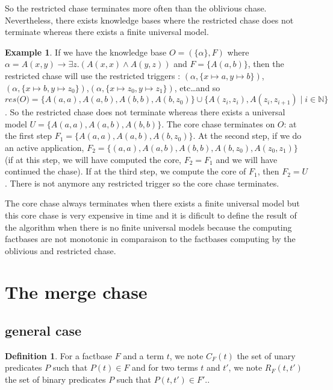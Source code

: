 \documentclass{article}
\theoremstyle{definition}
\newtheorem{definition}{Definition}[section]
\newtheorem{example}{Example}[section]
\theoremstyle{remark}
\def \N {\mathbb N}
\begin{document}
So the restricted chase terminates more often than the oblivious chase. Nevertheless, there exists knowledge bases where the restricted chase does not terminate whereas there exists a finite universal model. \begin{example}
If we have the knowledge base $O=(\{\alpha\},F)$ where $\alpha = A(x,y) \rightarrow \exists z.(A(x,x) \wedge A(y,z))$ and $F =  \{A(a,b)\}$, then the restricted chase will use the restricted triggers : $(\alpha, \{x \mapsto a, y \mapsto b\})$, $(\alpha, \{x \mapsto b, y \mapsto z_0\})$,$(\alpha, \{x \mapsto z_0, y \mapsto z_1\})$, etc\ldots and so  $\textit{res(O)} = \{A(a,a),A(a,b),A(b,b),A(b,z_0)\} \cup \{A(z_i,z_i),A(z_i,z_{i+1})\mid i \in \N\}$. So the restricted chase does not terminate whereas there exists a universal model $U = \{A(a,a),A(a,b),A(b,b)\}$. The core chase terminates on $O$: at the first step $F_1 = \{A(a,a),A(a,b),A(b,z_0)\}$. At the second step, if we do an active application, $F_2 = \{(a,a),A(a,b),A(b,b),A(b,z_0),A(z_0,z_1)\}$ (if at this step, we will have computed the core, $F_2 = F_1$ and we will have continued the chase). If at the third step, we compute the core of $F_1$, then $F_2 = U$. There is not anymore any restricted trigger so the core chase terminates. 
\end{example}
The core chase always terminates when there exists a finite universal model but this core chase is very expensive in time and it is dificult to define the result of the algorithm when there is no finite universal models because the computing factbases are not monotonic in comparaison to the factbases computing by the oblivious and restricted chase.

\section{The merge chase}

\subsection{general case}

\begin{definition}
For a factbase $F$ and a term $t$, we note \emph{$C_F(t)$} the set of unary predicates $P$ such that $P(t)\in F$ and for two terms $t$ and $t'$, we note \emph{$R_{F}(t,t')$} the set of binary predicates $P$ such that $P(t,t')\in F'$..
\end{definition}
\end{document}
